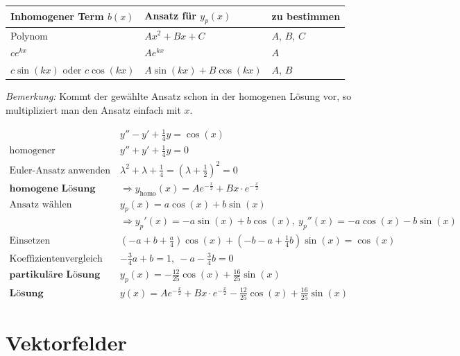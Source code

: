 \documentclass[11pt]{article}
\begin{document}
\begin{table}[H]
\centering
\begin{tabular}{|l|l|l|}
\hline
\textbf{Inhomogener Term $b(x)$} & \textbf{Ansatz f{\"u}r $y_p(x)$}	& \textbf{zu bestimmen}		\\ \hline
Polynom				& $Ax^2 + Bx + C$			& $A$, $B$, $C$		\\ \hline
$c e^{k x}$ & $Ae^{kx}$					& $A$				\\ \hline
$c\sin(kx)$ oder $c\cos(kx)$ & $A\sin(kx) + B\cos(kx)$ & $A$, $B$ \\ \hline

\end{tabular}
\end{table}

\emph{Bemerkung:} Kommt der gew{\"a}hlte Ansatz schon in der homogenen L{\"o}sung vor, so multipliziert man den Ansatz einfach mit $x$.

\begin{equation*}
\begin{split}
	& y'' - y' + \frac{1}{4}y = \cos(x) \\
	\text{homogener}\quad & y'' + y' + \frac{1}{4}y = 0 \\
	\text{Euler-Ansatz anwenden}\quad & \lambda^2 + \lambda + \frac{1}{4} = (\lambda + \frac{1}{2})^2 = 0 \\
	\textbf{homogene L{\"o}sung}\quad &\Rightarrow y_\text{homo}(x) = Ae^{-\frac{x}{2}} + Bx \cdot e^{-\frac{x}{2}} \\
	\text{Ansatz w{\"a}hlen}\quad & y_p(x) = a\cos(x) + b\sin(x) \\
							  & \Rightarrow y_p'(x) = -a\sin(x) + b\cos(x),\  y_p''(x) = -a\cos(x) -b \sin(x) \\
	\text{Einsetzen}\quad & (-a + b + \frac{a}{4})\cos(x) + (-b -a + \frac{1}{4}b)\sin(x) = \cos(x) \\
	\text{Koeffizientenvergleich}\quad & -\frac{3}{4}a + b = 1,\ -a-\frac{3}{4}b = 0 \\
	\textbf{partikul{\"a}re L{\"o}sung}\quad & y_p(x) = -\frac{12}{25}\cos(x) + \frac{16}{25}\sin(x) \\
	\textbf{L{\"o}sung}\quad & y(x) = Ae^{-\frac{x}{2}} + Bx \cdot e^{-\frac{x}{2}} -\frac{12}{25}\cos(x) + \frac{16}{25}\sin(x)
\end{split}
\end{equation*}

\section{Vektorfelder}
\end{document}
